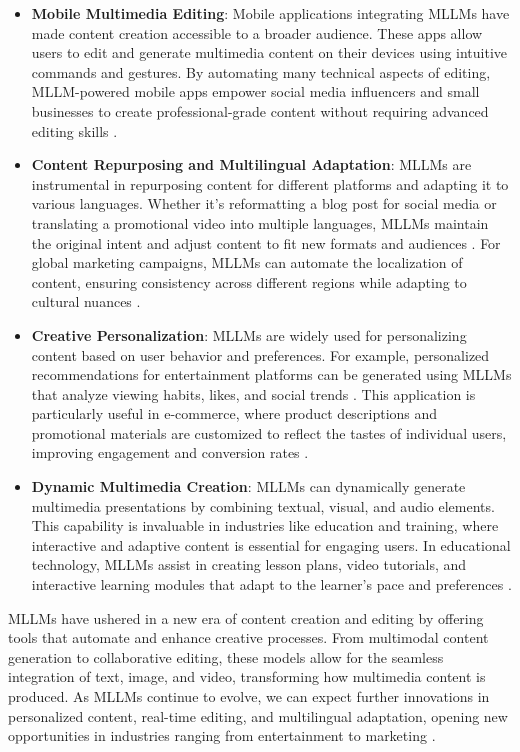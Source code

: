 \begin{itemize}
\item \textbf{Mobile Multimedia Editing}: Mobile applications integrating MLLMs have made content creation accessible to a broader audience. These apps allow users to edit and generate multimedia content on their devices using intuitive commands and gestures. By automating many technical aspects of editing, MLLM-powered mobile apps empower social media influencers and small businesses to create professional-grade content without requiring advanced editing skills \cite{vs2024jokela}.

\item \textbf{Content Repurposing and Multilingual Adaptation}: MLLMs are instrumental in repurposing content for different platforms and adapting it to various languages. Whether it's reformatting a blog post for social media or translating a promotional video into multiple languages, MLLMs maintain the original intent and adjust content to fit new formats and audiences \cite{vs2024obrenovic}. For global marketing campaigns, MLLMs can automate the localization of content, ensuring consistency across different regions while adapting to cultural nuances \cite{vs2024bateman}.

\item \textbf{Creative Personalization}: MLLMs are widely used for personalizing content based on user behavior and preferences. For example, personalized recommendations for entertainment platforms can be generated using MLLMs that analyze viewing habits, likes, and social trends \cite{vs2024bateman}. This application is particularly useful in e-commerce, where product descriptions and promotional materials are customized to reflect the tastes of individual users, improving engagement and conversion rates \cite{vs2024schmidt}.

\item \textbf{Dynamic Multimedia Creation}: MLLMs can dynamically generate multimedia presentations by combining textual, visual, and audio elements. This capability is invaluable in industries like education and training, where interactive and adaptive content is essential for engaging users. In educational technology, MLLMs assist in creating lesson plans, video tutorials, and interactive learning modules that adapt to the learner's pace and preferences \cite{vs2024anderson}.

\end{itemize}

MLLMs have ushered in a new era of content creation and editing by offering tools that automate and enhance creative processes. From multimodal content generation to collaborative editing, these models allow for the seamless integration of text, image, and video, transforming how multimedia content is produced. As MLLMs continue to evolve, we can expect further innovations in personalized content, real-time editing, and multilingual adaptation, opening new opportunities in industries ranging from entertainment to marketing \cite{vs2024chang,vs2024kubicek}.

